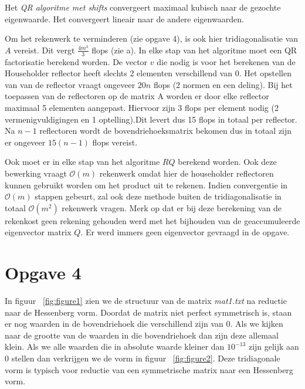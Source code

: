 \documentclass[a4paper]{article}
\newcommand{\opgave}[1]{\section*{Opgave #1}}
\begin{document}
\begin{enumerate}[a)]
Het \textit{QR algoritme met shifts} convergeert maximaal kubisch naar de gezochte eigenwaarde. Het convergeert lineair naar de andere eigenwaarden. 

Om het rekenwerk te verminderen (zie opgave 4), is ook hier tridiagonalisatie van $A$ vereist. Dit vergt  $\frac{4m^{3}}{3}$ flops (zie a). In elke stap van het algoritme moet een QR factorisatie berekend worden. De vector $v$ die nodig is voor het berekenen van de Householder reflector heeft slechts 2 elementen verschillend van 0. Het opstellen van van de reflector vraagt ongeveer $20n$ flops (2 normen en een deling). Bij het toepassen van de reflectoren op de matrix A worden er door elke reflector maximaal 5 elementen aangepast. Hiervoor zijn 3 flops per element nodig (2 vermenigvuldigingen en 1 optelling).Dit levert dus 15 flops in totaal per reflector. Na $n-1$ reflectoren wordt de bovendriehoeksmatrix bekomen dus in totaal zijn er ongeveer $15(n-1)$ flops vereist. 

Ook moet er in elke stap van het algoritme $RQ$ berekend worden. Ook deze bewerking vraagt $\mathcal{O}(m)$ rekenwerk omdat hier de householder reflectoren kunnen gebruikt worden om het product uit te rekenen. Indien convergentie in $\mathcal{O}(m)$ stappen gebeurt, zal ook deze methode buiten de tridiagonalisatie in totaal $\mathcal{O} (m^2)$ rekenwerk vragen. Merk op dat er bij deze berekening van de rekenkost geen rekening gehouden werd met het bijhouden van de geaccumuleerde eigenvector matrix $Q$. Er werd immers geen eigenvector gevraagd in de opgave.
\end{enumerate}
\newpage
\opgave{4}
In figuur ~\ref{fig:figure1} zien we de structuur van de matrix \textit{mat1.txt} na reductie naar de Hessenberg vorm. Doordat de matrix niet perfect symmetrisch is, staan er nog waarden in de bovendriehoek die verschillend zijn van 0. Als we kijken naar de grootte van de waarden in die bovendriehoek dan zijn deze allemaal klein. Als we alle waarden die in absolute waarde kleiner dan $10^{-13}$ zijn gelijk aan 0 stellen dan verkrijgen we de vorm in figuur ~\ref{fig:figure2}. Deze tridiagonale vorm is typisch voor reductie van een symmetrische matrix naar een Hessenberg vorm.
\end{document}
